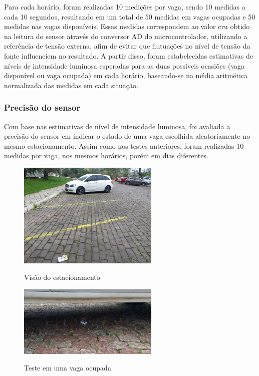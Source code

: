 \documentclass[oneside,openright,12pt]{ufsm_2015} %
\begin{document}
    Para cada horário, foram realizadas 10 medições por vaga, sendo 10 medidas a cada 10 segundos, resultando em um total de 50 medidas em vagas ocupadas e 50 medidas nas vagas disponíveis. Essas medidas correspondem ao valor cru obtido na leitura do sensor através do conversor AD do microcontrolador, utilizando a referência de tensão externa, afim de evitar que flutuações no nível de tensão da fonte influenciem no resultado. A partir disso, foram estabelecidas estimativas de níveis de intensidade luminosa esperadas para as duas possíveis ocasiões (vaga disponível ou vaga ocupada) em cada horário, baseando-se na média aritmética normalizada das medidas em cada situação. 
    
    \subsubsection{Precisão do sensor}
    Com base nas estimativas de nível de intensidade luminosa, foi avaliada a precisão do sensor em indicar o estado de uma vaga escolhida aleatoriamente no mesmo estacionamento. Assim como nos testes anteriores, foram realizadas 10 medidas por vaga, nos mesmos horários, porém em dias diferentes. 
    
    \begin{figure}[H]
     	    \caption{\label{exepretex} Visão do estacionamento}
            \centering
            \includegraphics[width=0.6\textwidth]{figuras/estacionamento_visao.jpg}
            \vspace{\baselineskip} %
            \label{fig:estac-visao}
    \end{figure}
    
    \begin{figure}[H]
     	    \caption{\label{exepretex} Teste em uma vaga ocupada}
            \centering
            \includegraphics[width=0.6\textwidth]{figuras/ocupada.png}
            \vspace{\baselineskip} %
            \label{fig:ocupada}
    \end{figure}
    
\end{document}
